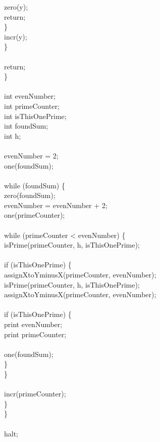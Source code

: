 {            zero(y); \\
            return; \\
        \} \\
        incr(y); \\
    \} \\
\\    
    return; \\
\} \\
\\
int evenNumber; \\
int primeCounter; \\
int isThisOnePrime; \\
int foundSum; \\
int h; \\
\\
evenNumber = 2;\\
one(foundSum);\\
\\
while (foundSum) \{\\
    zero(foundSum);\\
    evenNumber = evenNumber + 2;\\
    one(primeCounter);\\
    \\
    while (primeCounter < evenNumber) \{\\    
        isPrime(primeCounter, h, isThisOnePrime);\\
        \\
        if (isThisOnePrime) \{\\
            assignXtoYminusX(primeCounter, evenNumber);\\
            isPrime(primeCounter, h, isThisOnePrime);\\
            assignXtoYminusX(primeCounter, evenNumber);\\
            \\
            if (isThisOnePrime) \{\\
                print evenNumber;\\
                print primeCounter;\\
                \\
                one(foundSum);\\
            \}\\
        \}\\
        \\
        incr(primeCounter);  \\
    \}         \\
\}\\
\\
halt;\\ }
